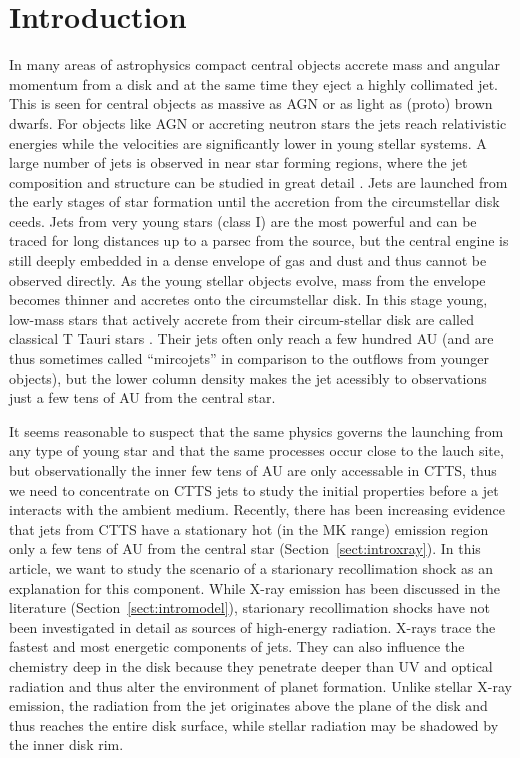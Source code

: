 \section{Introduction} 
In many areas of astrophysics compact central objects accrete mass and angular momentum from a disk and at the same time they eject a highly collimated jet. This is seen for central objects as massive as AGN or as light as (proto) brown dwarfs. For objects like AGN or accreting neutron stars the jets reach relativistic energies while the velocities are significantly lower in young stellar systems. 
A large number of jets is observed in near star forming regions, where the jet composition and structure can be studied in great detail \citep[see the review by][]{http://adsabs.harvard.edu/abs/2014arXiv1402.3553F}.
Jets are launched from the early stages of star formation until the accretion from the circumstellar disk ceeds. Jets from very young stars (class I) are the most powerful and can be traced for long distances up to a parsec from the source, but the central engine is still deeply embedded in a dense envelope of gas and dust and thus cannot be observed directly. As the young stellar objects evolve, mass from the envelope becomes thinner and accretes onto the circumstellar disk. In this stage young, low-mass stars that actively accrete from their circum-stellar disk are called classical T Tauri stars \citep[for a review see][]{2013AN....334...67G}. Their jets often only reach a few hundred AU (and are thus sometimes called ``mircojets'' in comparison to the outflows from younger objects), but the lower column density makes the jet acessibly to observations just a few tens of AU from the central star.

It seems reasonable to suspect that the same physics governs the launching from any type of young star and that the same processes occur close to the lauch site, but observationally the inner few tens of AU are only accessable in CTTS, thus we need to concentrate on CTTS jets to study the initial properties before a jet interacts with the ambient medium. Recently, there has been increasing evidence that jets from CTTS have a stationary hot (in the MK range) emission region only a few tens of AU from the central star (Section~\ref{sect:introxray}). In this article, we want to study the scenario of a starionary recollimation shock as an explanation for this component. While X-ray emission has been discussed in the literature (Section~\ref{sect:intromodel}), starionary recollimation shocks have not been investigated in detail as sources of high-energy radiation. X-rays trace the fastest and most energetic components of jets. They can also influence the chemistry deep in the disk \citep[e.g.][]{http://adsabs.harvard.edu/abs/2010ApJ...714.1511H,http://adsabs.harvard.edu/abs/2012ApJ...756..157G} because they penetrate deeper than UV and optical radiation and thus alter the environment of planet formation. Unlike stellar X-ray emission, the radiation from the jet originates above the plane of the disk and thus reaches the entire disk surface, while stellar radiation may be shadowed by the inner disk rim.

